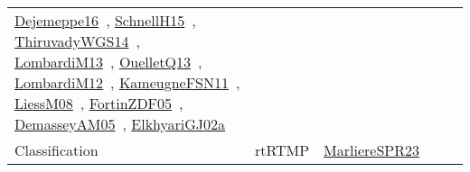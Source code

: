 {\begin{longtable}{lp{3cm}>{\raggedright\arraybackslash}p{6cm}>{\raggedright\arraybackslash}p{6cm}>{\raggedright\arraybackslash}p{8cm}}
\href{../works/Dejemeppe16.pdf}{Dejemeppe16}~\cite{Dejemeppe16}, \href{../works/SchnellH15.pdf}{SchnellH15}~\cite{SchnellH15}, \href{../works/ThiruvadyWGS14.pdf}{ThiruvadyWGS14}~\cite{ThiruvadyWGS14}, \href{../works/LombardiM13.pdf}{LombardiM13}~\cite{LombardiM13}, \href{../works/OuelletQ13.pdf}{OuelletQ13}~\cite{OuelletQ13}, \href{../works/LombardiM12.pdf}{LombardiM12}~\cite{LombardiM12}, \href{../works/KameugneFSN11.pdf}{KameugneFSN11}~\cite{KameugneFSN11}, \href{../works/LiessM08.pdf}{LiessM08}~\cite{LiessM08}, \href{../works/FortinZDF05.pdf}{FortinZDF05}~\cite{FortinZDF05}, \href{../works/DemasseyAM05.pdf}{DemasseyAM05}~\cite{DemasseyAM05}, \href{../works/ElkhyariGJ02a.pdf}{ElkhyariGJ02a}~\cite{ElkhyariGJ02a}\\
Classification & rtRTMP & \href{../works/MarliereSPR23.pdf}{MarliereSPR23}~\cite{MarliereSPR23} &  & \\

\end{longtable}}
